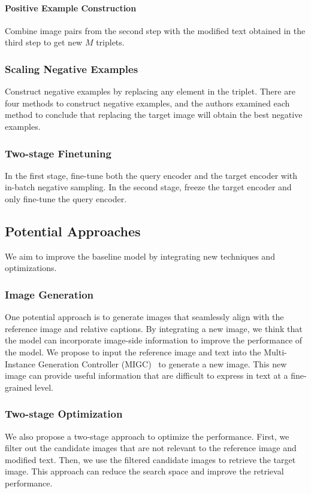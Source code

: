 \paragraph{Positive Example Construction}
Combine image pairs from the second step with the modified text obtained in the third step to get new \(M\) triplets.

\subsubsection{Scaling Negative Examples}
Construct negative examples by replacing any element in the triplet. There are four methods to construct negative examples, and the authors examined each method to conclude that replacing the target image will obtain the best negative examples.

\subsubsection{Two-stage Finetuning}
In the first stage, fine-tune both the query encoder and the target encoder with in-batch negative sampling. In the second stage, freeze the target encoder and only fine-tune the query encoder.

\subsection{Potential Approaches}
We aim to improve the baseline model by integrating new techniques and optimizations.

\subsubsection{Image Generation}
One potential approach is to generate images that seamlessly align with the reference image and relative captions. By integrating a new image, we think that the model can incorporate image-side information to improve the performance of the model. We propose to input the reference image and text into the Multi-Instance Generation Controller (MIGC)~\cite{Zhou_2024_CVPR} to generate a new image. This new image can provide useful information that are difficult to express in text at a fine-grained level.

\subsubsection{Two-stage Optimization}
We also propose a two-stage approach to optimize the performance. First, we filter out the candidate images that are not relevant to the reference image and modified text. Then, we use the filtered candidate images to retrieve the target image. This approach can reduce the search space and improve the retrieval performance.
